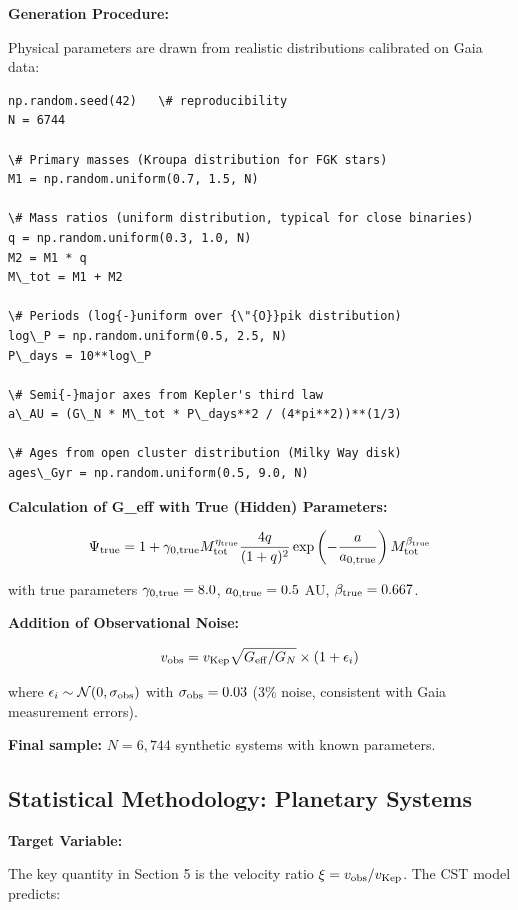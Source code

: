 \documentclass[11pt,a4paper]{article}
\begin{document}
\textbf{Generation Procedure:}

Physical parameters are drawn from realistic distributions calibrated on
Gaia data:

\begin{lstlisting}
np.random.seed(42)   \# reproducibility
N = 6744

\# Primary masses (Kroupa distribution for FGK stars)
M1 = np.random.uniform(0.7, 1.5, N)

\# Mass ratios (uniform distribution, typical for close binaries)
q = np.random.uniform(0.3, 1.0, N)
M2 = M1 * q
M\_tot = M1 + M2

\# Periods (log{-}uniform over {\"{O}}pik distribution)
log\_P = np.random.uniform(0.5, 2.5, N)
P\_days = 10**log\_P

\# Semi{-}major axes from Kepler's third law
a\_AU = (G\_N * M\_tot * P\_days**2 / (4*pi**2))**(1/3)

\# Ages from open cluster distribution (Milky Way disk)
ages\_Gyr = np.random.uniform(0.5, 9.0, N)
\end{lstlisting}

\textbf{Calculation of G\_eff with True (Hidden) Parameters:}

\[\Psi_{\rm true} = 1 + \gamma_{0,\rm true} M_{\rm tot}^{\eta_{\rm true}} \frac{4q}{(1+q)^2} \exp\left(-\frac{a}{a_{0,\rm true}}\right) M_{\rm tot}^{\beta_{\rm true}}\]

with true parameters \(\gamma_{0,\rm true} = 8.0\),
\(a_{0,\rm true} = 0.5\) AU, \(\beta_{\rm true} = 0.667\).

\textbf{Addition of Observational Noise:}

\[v_{\rm obs} = v_{\rm Kep} \sqrt{G_{\rm eff}/G_N} \times (1 + \epsilon_i)\]

where \(\epsilon_i \sim \mathcal{N}(0, \sigma_{\rm obs})\) with
\(\sigma_{\rm obs} = 0.03\) (3\% noise, consistent with Gaia measurement
errors).

\textbf{Final sample:} \(N = 6,744\) synthetic systems with known
parameters.

\hypertarget{statistical-methodology-planetary-systems}{%
\subsection{Statistical Methodology: Planetary
Systems}\label{statistical-methodology-planetary-systems}}

\textbf{Target Variable:}

The key quantity in Section 5 is the velocity ratio
\(\xi = v_{\rm obs}/v_{\rm Kep}\). The CST model predicts:
\end{document}
